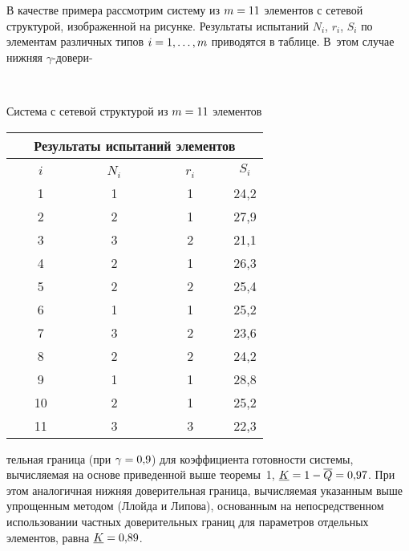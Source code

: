 \begin{multicols}{2}
     В качестве примера рассмотрим систему из $m\hm=11$ элементов с 
сетевой структурой, изображенной на рисунке. Результаты испытаний $N_i$, 
$r_i$, $S_i$ по элементам различных типов $i\hm=1,\ldots ,m$ приводятся в 
таблице. В~этом случае нижняя $\gamma$-до\-ве\-ри-\linebreak\vspace*{-12pt}

\columnbreak

 \begin{center}
 \mbox{%
 \epsfxsize=74.155mm
 }
 \end{center}
\begin{center}
{\small{Система с сетевой структурой из $m\hm=11$ элементов}}
\end{center}



\vspace*{6pt}




{\small
\begin{center}
\begin{tabular}{|c|c|c|c|}
\multicolumn{4}{c}{Результаты испытаний элементов}\\[6pt]
\hline
\ \ \ \ $i$\ \ \ \ &\ \ \ \ $N_i$\ \ \ \ &\ \ \ \ $r_i$\ \ \ \ & $S_i$\\
\hline
1&1&1&24,2\\
2& 2&1&27,9\\
3& 3& 2& 21,1\\
4& 2& 1& 26,3\\
5& 2&2&25,4\\
6& 1&1&25,2\\
7& 3&2& 23,6\\
8& 2&2&24,2\\
9& 1&1&28,8\\
10\hphantom{9}& 2& 1& 25,2\\
11\hphantom{9}& 3&3&22,3\\
\hline
\end{tabular}
\end{center}
}

\vspace*{9pt}

      


\noindent
тель\-ная граница (при 
$\gamma\hm=0{,}9$) для коэффициента
 готовности системы, вычисляемая на 
основе приведенной выше теоремы~1, $\underline{K}\hm= 1-
\overline{Q}\hm=0{,}97$. При этом аналогичная нижняя доверительная 
граница, вычисляемая указанным выше упрощенным методом (Ллойда и 
Липова), основанным на непосредственном использовании частных 
доверительных границ для параметров отдельных элементов, равна 
$\underline{K}\hm=0{,}89$. 




\end{multicols}
